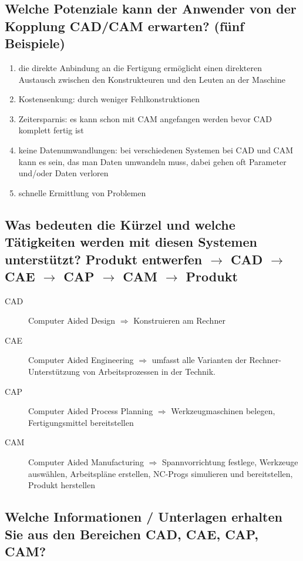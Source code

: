 \subsection*{Welche Potenziale kann der Anwender von der Kopplung CAD/CAM erwarten? 
(fünf Beispiele) }

\begin{enumerate}[1)]
    \item die direkte Anbindung an die Fertigung ermöglicht einen direkteren Austausch zwischen den Konstrukteuren und den Leuten an der Maschine
    \item Kostensenkung: durch weniger Fehlkonstruktionen
    \item Zeitersparnis: es kann schon mit CAM angefangen werden bevor CAD komplett fertig ist
    \item keine Datenumwandlungen: bei verschiedenen Systemen bei CAD und CAM kann es sein, das man Daten umwandeln muss, dabei gehen oft Parameter und/oder Daten verloren
    \item schnelle Ermittlung von Problemen
\end{enumerate}

\newpage

\subsection*{Was bedeuten die Kürzel und welche Tätigkeiten werden mit diesen Systemen 
    unterstützt?  
Produkt entwerfen $\rightarrow$ CAD $\rightarrow$ CAE $\rightarrow$ CAP $\rightarrow$ CAM $\rightarrow$ Produkt }

\begin{description}
    \item[CAD] Computer Aided Design $\Rightarrow$ Konstruieren am Rechner
    \item[CAE] Computer Aided Engineering $\Rightarrow$ umfasst alle Varianten der Rechner-Unterstützung von Arbeitsprozessen in der Technik.
    \item[CAP] Computer Aided Process Planning $\Rightarrow$ Werkzeugmaschinen belegen, Fertigungsmittel bereitstellen
    \item[CAM] Computer Aided Manufacturing $\Rightarrow$ Spannvorrichtung festlege, Werkzeuge auswählen, Arbeitspläne erstellen, NC-Progs simulieren und bereitstellen, Produkt herstellen
\end{description}

\subsection*{Welche Informationen / Unterlagen erhalten Sie aus den Bereichen CAD, CAE, 
CAP, CAM? }

